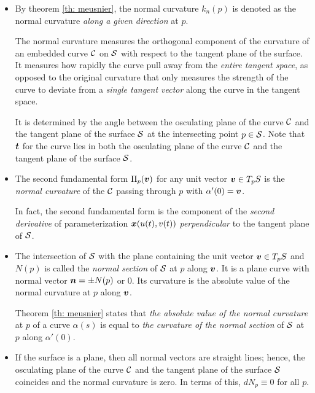 \documentclass[11pt]{article}
\begin{document}
\begin{itemize}
\item \begin{remark}
By theorem \ref{th: meusnier}, the normal curvature $k_{n}(p)$ is denoted as the normal curvature \emph{along a given direction} at $p$. 

The normal curvature measures the orthogonal component of the curvature of an embedded curve ${\mathcal C}$ on ${\mathcal S}$ with respect to the tangent plane of the surface. It measures how rapidly the curve pull away from the \emph{entire tangent space}, as opposed to the original curvature that only measures the strength of the curve to deviate from a \emph{single tangent vector} along the curve in the tangent space. 

It is determined by the angle between the osculating plane of the curve ${\mathcal C}$ and the tangent plane of the surface ${\mathcal S}$ at the intersecting point $p\in {\mathcal S}$. Note that $\boldsymbol{t}$ for the curve lies in both the osculating plane of the curve ${\mathcal C}$ and the tangent plane of the surface ${\mathcal S}$.\\
\end{remark}

\item   \begin{remark}
The second fundamental form $\Pi_{p}(\boldsymbol{v})$ for any unit vector $\boldsymbol{v}\in T_{p}S$ is the \emph{normal curvature} of the ${\mathcal C}$ passing through $p$ with $\alpha'(0) = \boldsymbol{v}$.

In fact, the second fundamental form is the component of the \emph{second derivative} of parameterization $\boldsymbol{x}(u(t), v(t))$ \emph{perpendicular} to the tangent plane of ${\mathcal S}$.
\end{remark}

\item \begin{definition} 
The intersection of ${\mathcal S}$ with the plane containing the unit vector $\boldsymbol{v}\in T_{p}S$ and $N(p)$ is called the \emph{normal section} of ${\mathcal S}$ at $p$ along $\boldsymbol{v}$. It is a plane curve with normal vector $\boldsymbol{n} = \pm N(p)$ or $0$. Its curvature is the absolute value of the normal curvature at $p$ along $\boldsymbol{v}$. 

Theorem \ref{th: meusnier} states that \emph{the absolute value of the normal curvature }at $p$ of a curve $\alpha(s)$ is equal to \emph{the curvature of the normal section} of ${\mathcal S}$ at $p$ along $\alpha'(0)$.\\
\end{definition}

\item  \begin{remark}
If the surface is a plane, then all normal vectors are straight lines; hence, the  osculating plane of the curve ${\mathcal C}$ and the tangent plane of the surface ${\mathcal S}$ coincides and the normal curvature is zero. In terms of this, $dN_{p} \equiv 0$ for all $p$.
\end{remark}


\end{itemize}
\end{document}
